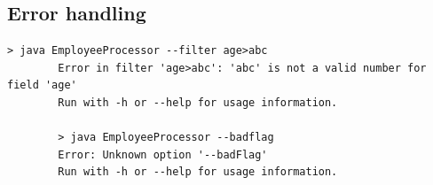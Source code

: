 \documentclass[12pt, a4paper]{article}
\begin{document}
	\subsection{Error handling}
	
	\begin{lstlisting}[style=output]
		> java EmployeeProcessor --filter age>abc
		Error in filter 'age>abc': 'abc' is not a valid number for field 'age'
		Run with -h or --help for usage information.
		
		> java EmployeeProcessor --badflag
		Error: Unknown option '--badFlag'
		Run with -h or --help for usage information.
	\end{lstlisting}
	
	\newpage
	\singlespacing
	
	
	
\end{document}
